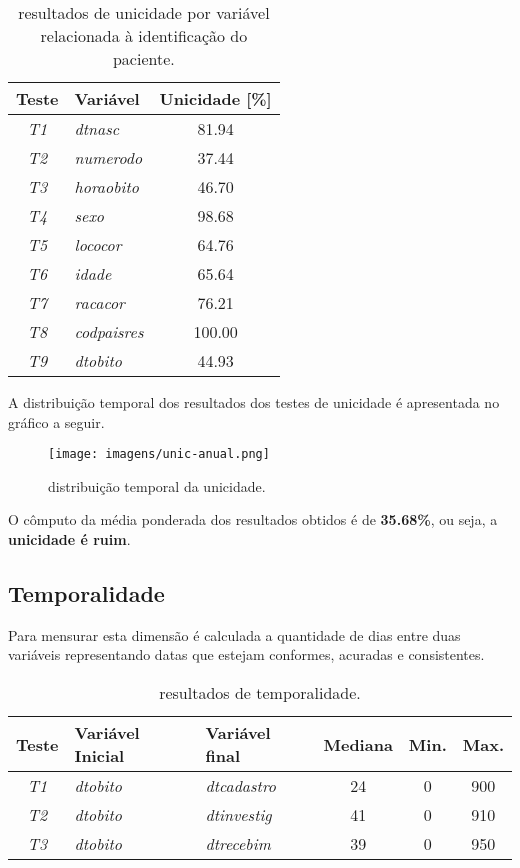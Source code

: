 \documentclass[
  12,
  table]{proadi}
\begin{document}
\begin{table}[H]

\caption{\label{tab:unnamed-chunk-19}resultados de unicidade por variável relacionada à identificação do paciente.}
\centering
\fontsize{10}{12}\selectfont
\begin{tabular}[t]{>{}c>{}lc}
\toprule
Teste & Variável & Unicidade [\%]\\
\midrule
\em{T1} & \em{dtnasc} & 81.94\\
\em{T2} & \em{numerodo} & 37.44\\
\em{T3} & \em{horaobito} & 46.70\\
\em{T4} & \em{sexo} & 98.68\\
\em{T5} & \em{lococor} & 64.76\\
\addlinespace
\em{T6} & \em{idade} & 65.64\\
\em{T7} & \em{racacor} & 76.21\\
\em{T8} & \em{codpaisres} & 100.00\\
\em{T9} & \em{dtobito} & 44.93\\
\bottomrule
\end{tabular}
\end{table}

A distribuição temporal dos resultados dos testes de unicidade é
apresentada no gráfico a seguir.

\begin{figure}
\centering
\texttt{[image: imagens/unic-anual.png]}
\caption{distribuição temporal da unicidade.}
\end{figure}

O cômputo da média ponderada dos resultados obtidos é de
\textbf{35.68\%}, ou seja, a \textbf{unicidade é ruim}.

\hypertarget{temporalidade}{%
\subsection{Temporalidade}\label{temporalidade}}

Para mensurar esta dimensão é calculada a quantidade de dias entre duas
variáveis representando datas que estejam conformes, acuradas e
consistentes.

\begin{table}[H]

\caption{\label{tab:unnamed-chunk-20}resultados de temporalidade.}
\centering
\fontsize{10}{12}\selectfont
\begin{tabular}[t]{>{}c>{}l>{}lccc}
\toprule
Teste & Variável Inicial & Variável final & Mediana & Min. & Max.\\
\midrule
\em{T1} & \em{dtobito} & \em{dtcadastro} & 24 & 0 & 900\\
\em{T2} & \em{dtobito} & \em{dtinvestig} & 41 & 0 & 910\\
\em{T3} & \em{dtobito} & \em{dtrecebim} & 39 & 0 & 950\\
\bottomrule
\end{tabular}
\end{table}
\end{document}
